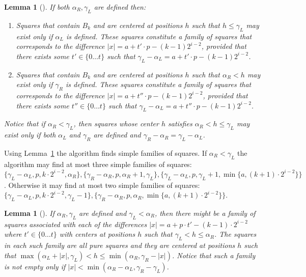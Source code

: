 \documentclass[10pt]{article}
\newtheorem{lem}[thm]{Lemma}
\begin{document}
\begin{lem}[{\rm\cite{2}}]
If both $\alpha_R, \gamma_L$ are defined then:

\begin{enumerate}
\item Squares that contain $B_k$ and are centered at positions $h$ such that $h \leq \gamma_L$ may exist only if
$\alpha_L$ is defined. These squares constitute a family of squares that corresponds to the difference
$|x| = a + t'\cdot p - (k-1)2^{i-2}$, provided that there exists some $t' \in \{0\dots t\}$ such that
$\gamma_L - \alpha_L = a + t'\cdot p - (k-1)2^{i-2}$.
\item Squares that contain $B_k$ and are centered at positions $h$ such that $\alpha_R < h$ may exist only if
$\gamma_R$ is defined. These squares constitute a family of squares that corresponds to the difference
$|x| = a + t''\cdot p - (k-1)2^{i-2}$, provided that there exists some $t'' \in \{0\dots t\}$ such that
$\gamma_L - \alpha_L = a + t''\cdot p - (k-1)2^{i-2}$.
\end{enumerate}
Notice that if $\alpha_R < \gamma_L$, then squares whose center $h$ satisfies $\alpha_R < h \leq\gamma_L$ may
exist only if both $\alpha_L$ and $\gamma_R$ are defined and $\gamma_R - \alpha_R = \gamma_L - \alpha_L$.
\label{lem:simple_squares}
\end{lem}

Using Lemma~\ref{lem:simple_squares} the algorithm finds simple families of squares. 
If $\alpha_R < \gamma_L$ the algorithm may find at most three simple families of squares: 
$\{\gamma_L - \alpha_L, p, k \cdot 2^{i-2}, \alpha_R\}, \{\gamma_R - \alpha_R, p, \alpha_R + 1, \gamma_L\},
\{\gamma_L - \alpha_L, p, \gamma_L + 1, \min\{a,(k+1) \cdot 2^{i-2}\}\}$. Otherwise it may find at most two simple
families of squares: $\{\gamma_L - \alpha_L, p, k \cdot 2^{i-2}, \gamma_L - 1\}, \{\gamma_R - \alpha_R, p, \alpha_R,
\min\{a,(k+1) \cdot 2^{i-2}\}\}$.

\begin{lem}[{\rm\cite{2}}]
If $\alpha_R, \gamma_L$ are defined and $\gamma_L < \alpha_R$, then there might be a family of squares
associated with each of the differences $|x| = a + p\cdot t' - (k-1)\cdot 2^{i-2}$ where $t' \in \{0\dots t\}$
with centers at positions $h$ such that $\gamma_L < h \leq \alpha_R$. The squares in each such family are all
pure squares and they are centered at positions $h$ such that $\max(\alpha_L + |x|, \gamma_L) < h \leq
\min(\alpha_R, \gamma_R-|x|)$. Notice that such a family is not empty only if $|x| < \min(\alpha_R-\alpha_L,
\gamma_R-\gamma_L)$.
\label{lem:dynamic_pure_squares}
\end{lem}
\end{document}
